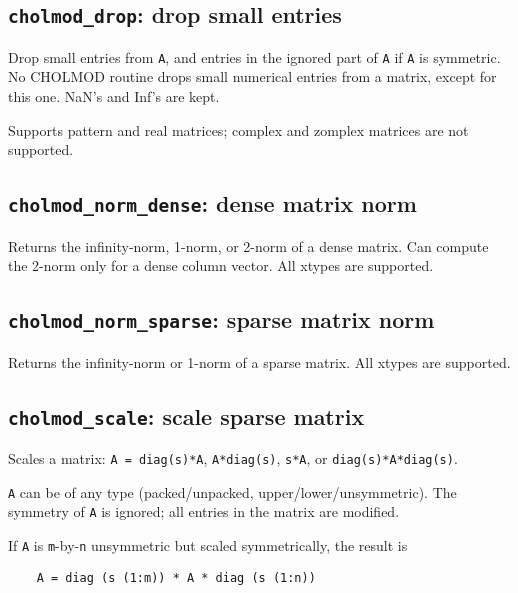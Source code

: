 \documentclass[11pt]{article}
\begin{document}
\subsection{{\tt cholmod\_drop}: drop small entries}


Drop small entries from {\tt A}, and entries in the ignored part of {\tt A} if {\tt A}
is symmetric.  No CHOLMOD routine drops small numerical entries
from a matrix, except for this one.  NaN's and Inf's are kept.

Supports pattern and real matrices; complex and zomplex matrices are not supported.

\subsection{{\tt cholmod\_norm\_dense}: dense matrix norm}


Returns the infinity-norm, 1-norm, or 2-norm of a dense matrix.
Can compute the 2-norm only for a dense column vector.
All xtypes are supported.

\subsection{{\tt cholmod\_norm\_sparse}: sparse matrix norm}


Returns the infinity-norm or 1-norm of a sparse matrix.
All xtypes are supported.

\newpage \subsection{{\tt cholmod\_scale}: scale sparse matrix}


Scales a matrix:  {\tt A = diag(s)*A}, {\tt A*diag(s)}, {\tt s*A}, or {\tt diag(s)*A*diag(s)}.

{\tt A} can be of any type (packed/unpacked, upper/lower/unsymmetric).
The symmetry of {\tt A} is ignored; all entries in the matrix are modified.

If {\tt A} is {\tt m}-by-{\tt n} unsymmetric but scaled symmetrically, the result is
\begin{verbatim}
    A = diag (s (1:m)) * A * diag (s (1:n))
\end{verbatim}
\end{document}
